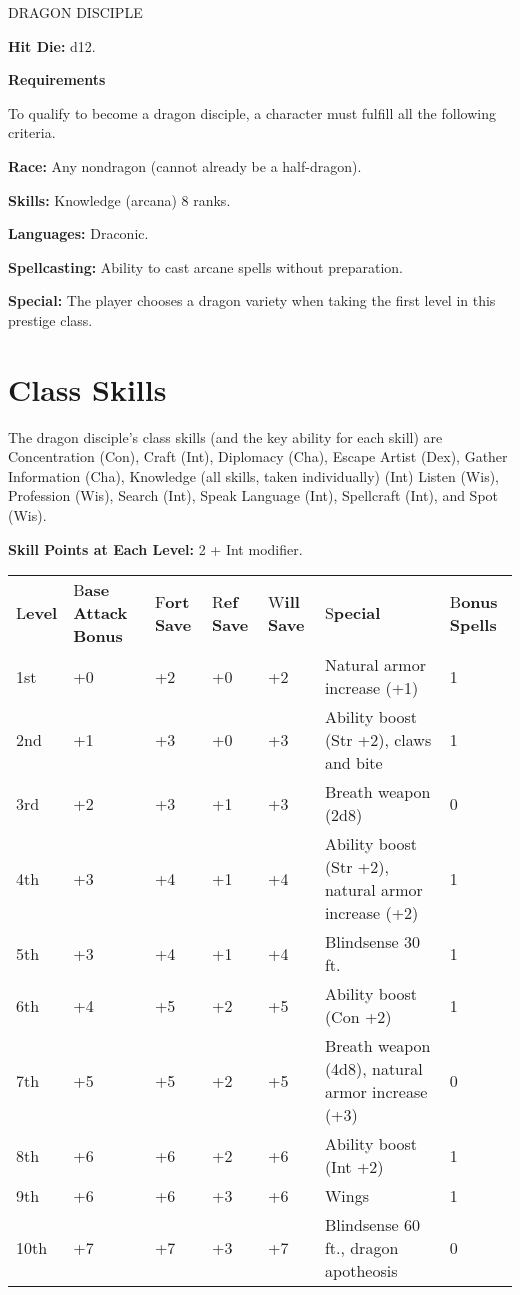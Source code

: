 \documentclass{article}
\begin{document}
\vspace{12pt}
DRAGON DISCIPLE

\textbf{Hit Die:} d12.

\textbf{Requirements}

To qualify to become a dragon disciple, a character must fulfill all the following 
criteria.

\textbf{Race:} Any nondragon (cannot already be a half-dragon).

\textbf{Skills:} Knowledge (arcana) 8 ranks.

\textbf{Languages:} Draconic.

\textbf{Spellcasting:} Ability to cast arcane spells without preparation.

\textbf{Special:} The player chooses a dragon variety when taking the first level 
in this prestige class.

\section*{\textbf{Class Skills}}

The dragon disciple's class skills (and the key ability for each skill) are Concentration 
(Con), Craft (Int), Diplomacy (Cha), Escape Artist (Dex), Gather Information (Cha), 
Knowledge (all skills, taken individually) (Int) Listen (Wis), Profession (Wis), 
Search (Int), Speak Language (Int), Spellcraft (Int), and Spot (Wis).  

\parindent=3pt
\textbf{Skill Points at Each Level:} 2 + Int modifier.

\vspace{12pt}
\parindent=0pt
\begin{tabular}{|>{\raggedright}p{19pt}|>{\raggedright}p{22pt}|>{\raggedright}p{15pt}|>{\raggedright}p{15pt}|>{\raggedright}p{15pt}|>{\raggedright}p{138pt}|>{\raggedright}p{38pt}|}
\hline
\multicolumn{7}{|p{266pt}|}{T\textbf{able: The Dragon Disciple}}\tabularnewline
\hline
L\textbf{evel} & B\textbf{ase}\linebreak{}
\textbf{Attack}\linebreak{}
\textbf{Bonus} & F\textbf{ort}\linebreak{}
\textbf{Save} & R\textbf{ef}\linebreak{}
\textbf{Save} & W\textbf{ill}\linebreak{}
\textbf{Save} & S\textbf{pecial} & B\textbf{onus Spells}\tabularnewline
\hline
1st & +0 & +2 & +0 & +2 & Natural armor increase (+1) & 1\tabularnewline
\hline
2nd & +1 & +3 & +0 & +3 & Ability boost (Str +2), claws and bite & 1\tabularnewline
\hline
3rd & +2 & +3 & +1 & +3 & Breath weapon (2d8) & 0\tabularnewline
\hline
4th & +3 & +4 & +1 & +4 & Ability boost (Str +2), natural armor increase (+2) & 1\tabularnewline
\hline
5th & +3 & +4 & +1 & +4 & Blindsense 30 ft. & 1\tabularnewline
\hline
6th & +4 & +5 & +2 & +5 & Ability boost (Con +2) & 1\tabularnewline
\hline
7th & +5 & +5 & +2 & +5 & Breath weapon (4d8), natural armor increase (+3) & 0\tabularnewline
\hline
8th & +6 & +6 & +2 & +6 & Ability boost (Int +2) & 1\tabularnewline
\hline
9th & +6 & +6 & +3 & +6 & Wings & 1\tabularnewline
\hline
10th & +7 & +7 & +3 & +7 & Blindsense 60 ft., dragon apotheosis & 0\tabularnewline
\hline
\end{tabular}
\end{document}
